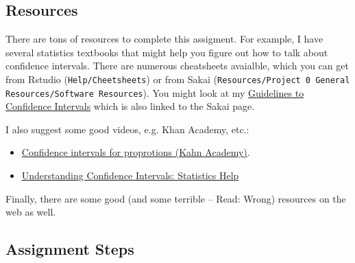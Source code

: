 \documentclass{tufte-handout}\usepackage[]{graphicx}\usepackage[]{color}
\begin{document}
\subsection{Resources}

There are tons of resources to complete this assigment. For example, I have several statistics textbooks that might help you figure out how to talk about confidence intervals. 
There are numerous cheatsheets avaialble, which you can get from Rstudio (\texttt{Help/Cheetsheets}) or from Sakai (\texttt{Resources/Project 0 General Resources/Software Resources}). You might look at my \href{https://github.com/marclos/beginnersluck/raw/master/Confidence_Intervals/Confidence_Intervals.pdf}{Guidelines to Confidence Intervals} which is also linked to the Sakai page.

I also suggest some good videos, e.g. Khan Academy, etc.:

\begin{itemize}
  \item \href{https://www.khanacademy.org/math/ap-statistics/estimating-confidence-ap/introduction-confidence-intervals/v/confidence-intervals-and-margin-of-error}{Confidence intervals for proprotions (Kahn Academy)}.
  \item \href{https://www.youtube.com/watch?v=tFWsuO9f74o}{Understanding Confidence Intervals: Statistics Help}
\end{itemize}


Finally, there are some good (and some terrible -- Read: Wrong) resources on the web as well. 

\subsection{Assignment Steps}
\end{document}
